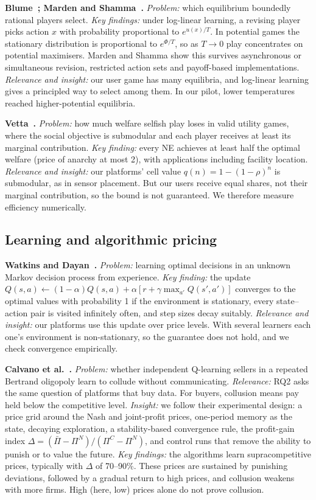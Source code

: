 \documentclass[12pt,draftcls,onecolumn]{IEEEtran}
\begin{document}
\textbf{Blume~\cite{blume1993}; Marden and Shamma~\cite{marden2012revisiting}.}
\emph{Problem:} which equilibrium boundedly rational players select.
\emph{Key findings:} under log-linear learning, a revising player picks action $x$ with probability proportional to $e^{u(x)/T}$. In potential games the stationary distribution is proportional to $e^{\Phi/T}$, so as $T\to0$ play concentrates on potential maximisers. Marden and Shamma show this survives asynchronous or simultaneous revision, restricted action sets and payoff-based implementations.
\emph{Relevance and insight:} our user game has many equilibria, and log-linear learning gives a principled way to select among them. In our pilot, lower temperatures reached higher-potential equilibria.

\textbf{Vetta~\cite{vetta2002}.}
\emph{Problem:} how much welfare selfish play loses in valid utility games, where the social objective is submodular and each player receives at least its marginal contribution.
\emph{Key finding:} every NE achieves at least half the optimal welfare (price of anarchy at most 2), with applications including facility location.
\emph{Relevance and insight:} our platforms' cell value $q(n)=1-(1-\rho)^n$ is submodular, as in sensor placement. But our users receive equal shares, not their marginal contribution, so the bound is not guaranteed. We therefore measure efficiency numerically.

\subsection{Learning and algorithmic pricing}
\textbf{Watkins and Dayan~\cite{watkins1992}.}
\emph{Problem:} learning optimal decisions in an unknown Markov decision process from experience.
\emph{Key finding:} the update $Q(s,a)\leftarrow(1-\alpha)Q(s,a)+\alpha[r+\gamma\max_{a'}Q(s',a')]$ converges to the optimal values with probability 1 if the environment is stationary, every state--action pair is visited infinitely often, and step sizes decay suitably.
\emph{Relevance and insight:} our platforms use this update over price levels. With several learners each one's environment is non-stationary, so the guarantee does not hold, and we check convergence empirically.

\textbf{Calvano et al.~\cite{calvano2020ai}.}
\emph{Problem:} whether independent Q-learning sellers in a repeated Bertrand oligopoly learn to collude without communicating.
\emph{Relevance:} RQ2 asks the same question of platforms that buy data. For buyers, collusion means pay held below the competitive level.
\emph{Insight:} we follow their experimental design: a price grid around the Nash and joint-profit prices, one-period memory as the state, decaying exploration, a stability-based convergence rule, the profit-gain index $\Delta=(\bar\Pi-\Pi^N)/(\Pi^C-\Pi^N)$, and control runs that remove the ability to punish or to value the future.
\emph{Key findings:} the algorithms learn supracompetitive prices, typically with $\Delta$ of 70--90\%. These prices are sustained by punishing deviations, followed by a gradual return to high prices, and collusion weakens with more firms. High (here, low) prices alone do not prove collusion.
\end{document}

